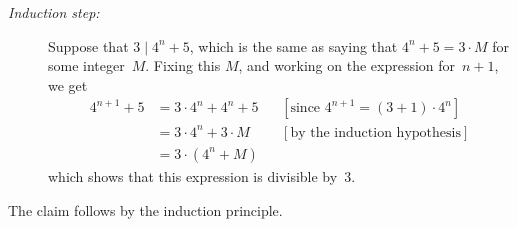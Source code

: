 \documentclass{jn-pset}
\begin{document}
\begin{problem}
\begin{solution}
\begin{description}
  \item[\emph{Induction step:}]
    Suppose that
    $
    3 \mid 4^n + 5
    $,
    which is the same  as saying that
    $
    4^n + 5 = 3 \cdot M
    $
    for some integer~$M$.
    Fixing this $M$, and
    working on the expression \mbox{for $n+1$}, we get
    \begin{align*}
      4^{n+1} + 5
      &= 
        3 \cdot 4^{n}
        + 
        4^{n} + 5
      &&[\text{since $4^{n+1} = (3 + 1) \cdot 4^n$}]
      \\
      &= 
        3 \cdot 4^{n}
        + 
        3 \cdot M
      &&[\text{by the induction hypothesis}]
      \\
      &=
        3 \cdot ( 4^{n} + M )
    \end{align*}
    which shows that this expression is divisible by~$3$.
  \end{description}
  The claim follows by the induction principle.
\end{solution}


\end{problem}

\end{document}
